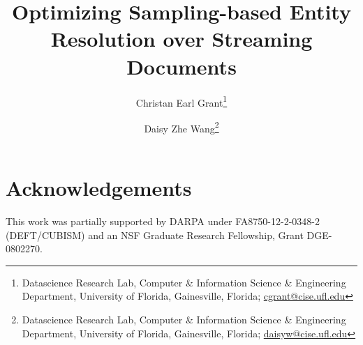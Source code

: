 \documentclass[twoside,leqno,twocolumn]{article}
\begin{document}
\title{Optimizing Sampling-based Entity Resolution over Streaming Documents}

\author{%
Christan Earl Grant\thanks{Datascience Research Lab, Computer \& Information Science \& Engineering Department, University of Florida, Gainesville, Florida; \url{cgrant@cise.ufl.edu}} 
\and 
Daisy Zhe Wang\thanks{Datascience Research Lab, Computer \& Information Science \& Engineering Department, University of Florida, Gainesville, Florida; \url{daisyw@cise.ufl.edu}}}


\date{}

\maketitle



















\section{Acknowledgements}
This work was partially supported by DARPA under FA8750-12-2-0348-2 (DEFT/CUBISM) and an NSF Graduate Research Fellowship, Grant DGE-0802270.






\end{document}
